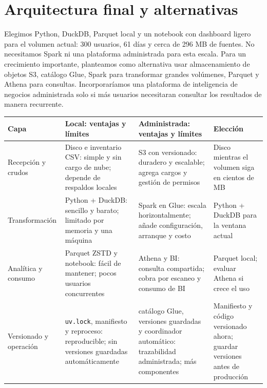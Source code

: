 \documentclass[11pt]{article}
\begin{document}
\section{Arquitectura final y alternativas}
Elegimos Python, DuckDB, Parquet local y un notebook con dashboard ligero para el volumen actual: 300 usuarios, 61 días y cerca de 296 MB de fuentes. No necesitamos Spark ni una plataforma administrada para esta escala. Para un crecimiento importante, planteamos como alternativa usar almacenamiento de objetos S3, catálogo Glue, Spark para transformar grandes volúmenes, Parquet y Athena para consultas. Incorporaríamos una plataforma de inteligencia de negocios administrada solo si más usuarios necesitaran consultar los resultados de manera recurrente.

\begin{center}\small
\begin{tabularx}{\textwidth}{|l|Y|Y|Y|}\hline
\textbf{Capa} & \textbf{Local: ventajas y límites} &
\textbf{Administrada: ventajas y límites} & \textbf{Elección}\\\hline
Recepción y crudos & Disco e inventario CSV: simple y sin cargo de nube; depende de respaldos locales & S3 con versionado: duradero y escalable; agrega cargos y gestión de permisos & Disco mientras el volumen siga en cientos de MB\\\hline
Transformación & Python + DuckDB: sencillo y barato; limitado por memoria y una máquina & Spark en Glue: escala horizontalmente; añade configuración, arranque y costo & Python + DuckDB para la ventana actual\\\hline
Analítica y consumo & Parquet ZSTD y notebook: fácil de mantener; pocos usuarios concurrentes & Athena y BI: consulta compartida; cobra por escaneo y consumo de BI & Parquet local; evaluar Athena si crece el uso\\\hline
Versionado y operación & \texttt{uv.lock}, manifiesto y reproceso: reproducible; sin versiones guardadas automáticamente & catálogo Glue, versiones guardadas y coordinador automático: trazabilidad administrada; más componentes & Manifiesto y código versionado ahora; guardar versiones antes de producción\\\hline
\end{tabularx}
\end{center}
\end{document}
